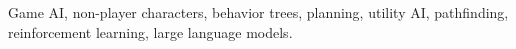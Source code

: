 
\begin{abstract}

\end{abstract}

\begin{IEEEkeywords}
Game AI, non-player characters, behavior trees, planning, utility AI,
pathfinding, reinforcement learning, large language models.
\end{IEEEkeywords}%
